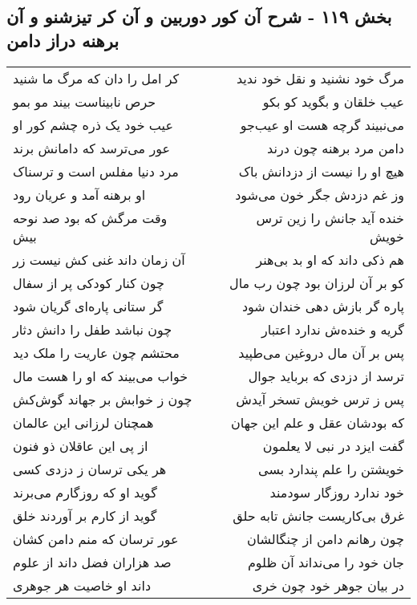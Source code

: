 \begin{center}
\section*{بخش ۱۱۹ - شرح آن کور دوربین و آن کر تیزشنو و  آن برهنه دراز دامن}
\label{sec:sh119}
\begin{longtable}{l p{0.5cm} r}
کر امل را دان که مرگ ما شنید
&&
مرگ خود نشنید و نقل خود ندید
\\
حرص نابیناست بیند مو بمو
&&
عیب خلقان و بگوید کو بکو
\\
عیب خود یک ذره چشم کور او
&&
می‌نبیند گرچه هست او عیب‌جو
\\
عور می‌ترسد که دامانش برند
&&
دامن مرد برهنه چون درند
\\
مرد دنیا مفلس است و ترسناک
&&
هیچ او را نیست از دزدانش باک
\\
او برهنه آمد و عریان رود
&&
وز غم دزدش جگر خون می‌شود
\\
وقت مرگش که بود صد نوحه بیش
&&
خنده آید جانش را زین ترس خویش
\\
آن زمان داند غنی کش نیست زر
&&
هم ذکی داند که او بد بی‌هنر
\\
چون کنار کودکی پر از سفال
&&
کو بر آن لرزان بود چون رب مال
\\
گر ستانی پاره‌ای گریان شود
&&
پاره گر بازش دهی خندان شود
\\
چون نباشد طفل را دانش دثار
&&
گریه و خنده‌ش ندارد اعتبار
\\
محتشم چون عاریت را ملک دید
&&
پس بر آن مال دروغین می‌طپید
\\
خواب می‌بیند که او را هست مال
&&
ترسد از دزدی که برباید جوال
\\
چون ز خوابش بر جهاند گوش‌کش
&&
پس ز ترس خویش تسخر آیدش
\\
همچنان لرزانی این عالمان
&&
که بودشان عقل و علم این جهان
\\
از پی این عاقلان ذو فنون
&&
گفت ایزد در نبی لا یعلمون
\\
هر یکی ترسان ز دزدی کسی
&&
خویشتن را علم پندارد بسی
\\
گوید او که روزگارم می‌برند
&&
خود ندارد روزگار سودمند
\\
گوید از کارم بر آوردند خلق
&&
غرق بی‌کاریست جانش تابه حلق
\\
عور ترسان که منم دامن کشان
&&
چون رهانم دامن از چنگالشان
\\
صد هزاران فضل داند از علوم
&&
جان خود را می‌نداند آن ظلوم
\\
داند او خاصیت هر جوهری
&&
در بیان جوهر خود چون خری
\\

\end{longtable}
\end{center}
